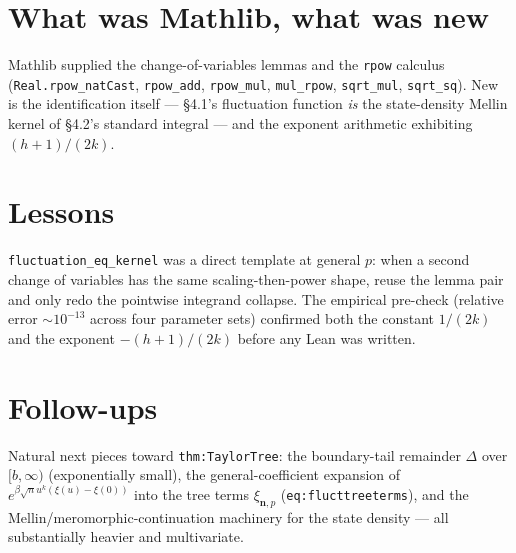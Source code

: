\documentclass[11pt]{article}
\begin{document}
\section{What was Mathlib, what was new}
Mathlib supplied the change-of-variables lemmas and the \texttt{rpow} calculus
(\texttt{Real.rpow\_natCast}, \texttt{rpow\_add}, \texttt{rpow\_mul}, \texttt{mul\_rpow},
\texttt{sqrt\_mul}, \texttt{sqrt\_sq}). New is the identification itself --- \S4.1's fluctuation
function \emph{is} the state-density Mellin kernel of \S4.2's standard integral --- and the exponent
arithmetic exhibiting $(h+1)/(2k)$.

\section{Lessons}
\texttt{fluctuation\_eq\_kernel} was a direct template at general $p$: when a second change of variables
has the same scaling-then-power shape, reuse the lemma pair and only redo the pointwise integrand
collapse. The empirical pre-check (relative error $\sim10^{-13}$ across four parameter sets) confirmed
both the constant $1/(2k)$ and the exponent $-(h+1)/(2k)$ before any Lean was written.

\section{Follow-ups}
Natural next pieces toward \texttt{thm:TaylorTree}: the boundary-tail remainder $\Delta$ over $[b,\infty)$
(exponentially small), the general-coefficient expansion of $e^{\beta\sqrt n u^k(\xi(u)-\xi(0))}$ into
the tree terms $\xi_{\mathbf n,p}$ (\texttt{eq:flucttreeterms}), and the Mellin/meromorphic-continuation
machinery for the state density --- all substantially heavier and multivariate.
\end{document}
